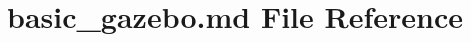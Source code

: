 \hypertarget{basic__gazebo_8md}{}\section{basic\+\_\+gazebo.\+md File Reference}
\label{basic__gazebo_8md}
